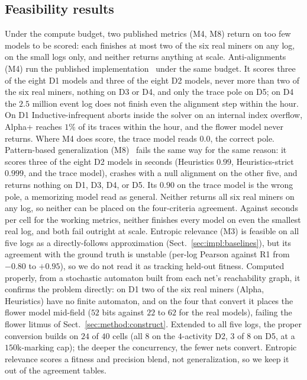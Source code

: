 \documentclass[runningheads]{llncs}
\newcommand{\chg}[1]{\textcolor{chgblue}{#1}}
\begin{document}
\subsection{Feasibility results}
\label{sec:eval:feasibility}
\chg{Under the compute budget, two published metrics (M4, M8) return on too few models to be scored: each finishes at most two of the six real miners on any log, on the small logs only, and neither returns anything at scale. Anti-alignments (M4) run the published implementation~\cite{vandongen2016anti} under the same budget. It scores three of the eight D1 models and three of the eight D2 models, never more than two of the six real miners, nothing on D3 or D4, and only the trace pole on D5; on D4 the $2.5$ million event log does not finish even the alignment step within the hour. On D1 Inductive-infrequent aborts inside the solver on an internal index overflow, Alpha+ reaches $1\%$ of its traces within the hour, and the flower model never returns. Where M4 does score, the trace model reads $0.0$, the correct pole. Pattern-based generalization (M8)~\cite{reissner2022pattern} fails the same way for the same reason: it scores three of the eight D2 models in seconds (Heuristics $0.99$, Heuristics-strict $0.999$, and the trace model), crashes with a null alignment on the other five, and returns nothing on D1, D3, D4, or D5. Its $0.90$ on the trace model is the wrong pole, a memorizing model read as general. Neither returns all six real miners on any log, so neither can be placed on the four-criteria agreement. Against seconds per cell for the working metrics, neither finishes every model on even the smallest real log, and both fail outright at scale.} \chg{Entropic relevance (M3) is feasible on all five logs as a directly-follows approximation (Sect.~\ref{sec:impl:baselines}), but its agreement with the ground truth is unstable (per-log Pearson against R1 from $-0.80$ to $+0.95$), so we do not read it as tracking held-out fitness. Computed properly, from a stochastic automaton built from each net's reachability graph, it confirms the problem directly: on D1 two of the six real miners (Alpha, Heuristics) have no finite automaton, and on the four that convert it places the flower model mid-field ($52$ bits against $22$ to $62$ for the real models), failing the flower litmus of Sect.~\ref{sec:method:construct}. Extended to all five logs, the proper conversion builds on $24$ of $40$ cells (all $8$ on the $4$-activity D2, $3$ of $8$ on D5, at a $150$k-marking cap); the deeper the concurrency, the fewer nets convert. Entropic relevance scores a fitness and precision blend, not generalization, so we keep it out of the agreement tables.}
\end{document}

